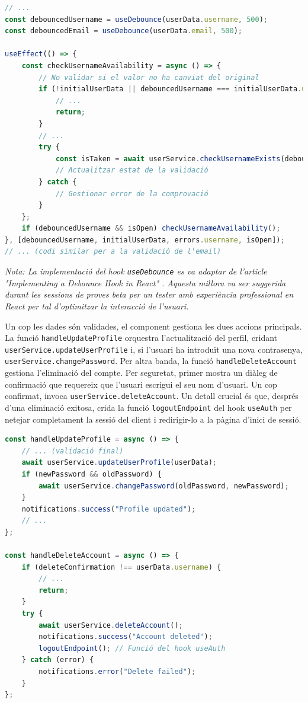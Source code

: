 \begin{lstlisting}[language=typescript, caption={Ús de `useDebounce` per a la validació a `UserSettings/index.tsx`}]
// ...
const debouncedUsername = useDebounce(userData.username, 500);
const debouncedEmail = useDebounce(userData.email, 500);

useEffect(() => {
    const checkUsernameAvailability = async () => {
        // No validar si el valor no ha canviat del original
        if (!initialUserData || debouncedUsername === initialUserData.username) {
            // ...
            return;
        }
        // ...
        try {
            const isTaken = await userService.checkUsernameExists(debouncedUsername);
            // Actualitzar estat de la validació
        } catch {
            // Gestionar error de la comprovació
        }
    };
    if (debouncedUsername && isOpen) checkUsernameAvailability();
}, [debouncedUsername, initialUserData, errors.username, isOpen]);
// ... (codi similar per a la validació de l'email)
\end{lstlisting}

\textit{Nota: La implementació del hook \texttt{useDebounce} es va adaptar de l'article "Implementing a Debounce Hook in React" \cite{debounce_hook_react}. Aquesta millora va ser suggerida durant les sessions de proves beta per un tester amb experiència professional en React per tal d'optimitzar la interacció de l'usuari.}

Un cop les dades són validades, el component gestiona les dues accions principals. La funció \texttt{handleUpdateProfile} orquestra l'actualització del perfil, cridant \texttt{userService.updateUserProfile} i, si l'usuari ha introduït una nova contrasenya, \texttt{userService.changePassword}. Per altra banda, la funció \texttt{handleDeleteAccount} gestiona l'eliminació del compte. Per seguretat, primer mostra un diàleg de confirmació que requereix que l'usuari escrigui el seu nom d'usuari. Un cop confirmat, invoca \texttt{userService.deleteAccount}. Un detall crucial és que, després d'una eliminació exitosa, crida la funció \texttt{logoutEndpoint} del hook \texttt{useAuth} per netejar completament la sessió del client i redirigir-lo a la pàgina d'inici de sessió.

\begin{lstlisting}[language=typescript, caption={Orquestració de les crides a l'API a `UserSettings/index.tsx`}]
const handleUpdateProfile = async () => {
    // ... (validació final)
    await userService.updateUserProfile(userData);
    if (newPassword && oldPassword) {
        await userService.changePassword(oldPassword, newPassword);
    }
    notifications.success("Profile updated");
    // ...
};

const handleDeleteAccount = async () => {
    if (deleteConfirmation !== userData.username) {
        // ...
        return;
    }
    try {
        await userService.deleteAccount();
        notifications.success("Account deleted");
        logoutEndpoint(); // Funció del hook useAuth
    } catch (error) {
        notifications.error("Delete failed");
    }
};
\end{lstlisting}

